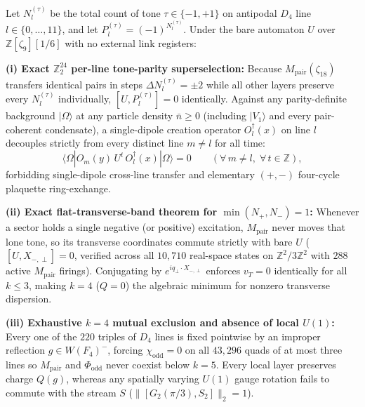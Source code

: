 \begin{theorem}
\label{thm:spin1-obstruction}
Let $N_l^{(\tau)}$ be the total count of tone $\tau \in \{-1, +1\}$ on antipodal $D_4$ line $l \in \{0, \dots, 11\}$,
and let $P_l^{(\tau)} = (-1)^{N_l^{(\tau)}}$. Under the bare automaton $U$ over $\mathbb{Z}[\zeta_9][1/6]$ with no
external link registers:

\textbf{(i) Exact $\mathbb{Z}_2^{24}$ per-line tone-parity superselection:} Because $M_{\mathrm{pair}}(\zeta_{18})$
transfers identical pairs in steps $\Delta N_l^{(\tau)} = \pm 2$ while all other layers preserve every $N_l^{(\tau)}$
individually, $[U, P_l^{(\tau)}] = 0$ identically. Against any parity-definite background $|\Omega\rangle$ at any
particle density $\bar{n} \ge 0$ (including $|V_1\rangle$ and every pair-coherent condensate), a single-dipole creation
operator $O_l^\dagger(x)$ on line $l$ decouples strictly from every distinct line $m \neq l$ for all time:
\begin{equation}
\langle\Omega | O_m(y)\, U^t\, O_l^\dagger(x) | \Omega\rangle = 0
\qquad (\forall\, m \neq l,\; \forall\, t \in \mathbb{Z}),
\label{eq:z24-superselection}
\end{equation}
forbidding single-dipole cross-line transfer and elementary $(+,-)$ four-cycle plaquette ring-exchange.

\textbf{(ii) Exact flat-transverse-band theorem for $\min(N_+, N_-) = 1$:} Whenever a sector holds a single negative
(or positive) excitation, $M_{\mathrm{pair}}$ never moves that lone tone, so its transverse coordinates commute strictly
with bare $U$ ($[U, X_{-,\perp}] = 0$, verified across all $10{,}710$ real-space states on $\mathbb{Z}^2 / 3\mathbb{Z}^2$
with $288$ active $M_{\mathrm{pair}}$ firings). Conjugating by $e^{i q_\perp \cdot X_{-,\perp}}$ enforces $v_T = 0$
identically for all $k \le 3$, making $k = 4$ ($Q = 0$) the algebraic minimum for nonzero transverse dispersion.

\textbf{(iii) Exhaustive $k = 4$ mutual exclusion and absence of local $U(1)$:} Every one of the $220$ triples of $D_4$
lines is fixed pointwise by an improper reflection $g \in W(F_4)^-$, forcing $\chi_{\mathrm{odd}} = 0$ on all
$43{,}296$ quads of at most three lines so $M_{\mathrm{pair}}$ and $\Phi_{\mathrm{odd}}$ never coexist below $k = 5$.
Every local layer preserves charge $Q(g)$, whereas any spatially varying $U(1)$ gauge rotation fails to commute with the
stream $S$ ($\|[G_2(\pi/3), S_2]\|_2 = 1$).
\end{theorem}

